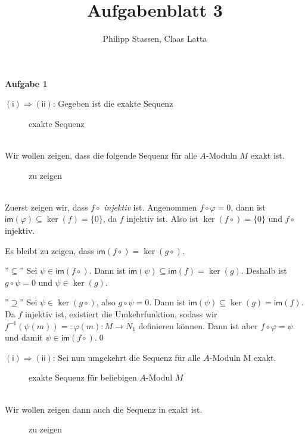 \documentclass{article}
\title{Aufgabenblatt 3}
\author{Philipp Stassen, Claas Latta}
\theoremstyle{definition}
\theoremstyle{plain}
\theoremstyle{remark}
\newcommand{\im}{\mathsf{im}}
\newcommand{\aufgabe}[1]{
	{
		\vspace*{0.5cm}
		\textsf{\textbf{Aufgabe #1}}
		\vspace*{0.2cm}

	}
}
\begin{document}
\maketitle
\aufgabe1
$\mathsf{(i)\Rightarrow (ii)}$: 
Gegeben ist die exakte Sequenz
\begin{figure}[h]
\centering
{}
\caption{exakte Sequenz}
\end{figure}\\
Wir wollen zeigen, dass die folgende Sequenz für alle $A$-Moduln $M$ exakt ist.
\begin{figure}[h]
\centering
{}
\caption{zu zeigen}
\end{figure} \\
Zuerst zeigen wir, dass $f\circ$ \emph{injektiv} ist. Angenommen $f\circ\varphi=0$, dann ist $\im(\varphi)\subseteq\ker(f)=\{0\}$, da $f$ injektiv ist. Also ist $\ker(f\circ)=\{0\}$ und $f\circ$ injektiv.\smallskip

Es bleibt zu zeigen, dass $\im(f\circ)=\ker(g\circ)$. 

\noindent ''$\subseteq$'' Sei $\psi\in\im(f\circ)$. Dann ist $\im(\psi)\subseteq\im(f)=\ker(g)$. Deshalb ist $g\circ \psi =0$ und $\psi\in\ker(g)$.

\noindent ''$\supseteq$'' Sei $\psi\in\ker(g\circ)$, also $g\circ\psi=0$. Dann ist $\im(\psi)\subseteq\ker(g)=\im(f)$. Da $f$ injektiv ist, existiert die Umkehrfunktion, sodass wir $f^{-1}(\psi(m))=:\varphi(m):M\to N_1$ definieren können. Dann ist aber $f\circ\varphi=\psi$ und damit $\psi\in\im(f\circ)$.\qed \medskip

$\mathsf{(i)}\Rightarrow\mathsf{(ii)}$: Sei nun umgekehrt die Sequenz für alle $A$-Moduln M exakt.
\begin{figure}[h]
\centering
{}
\caption{exakte Sequenz für beliebigen $A$-Modul $M$}
\end{figure} \\
Wir wollen zeigen dann auch die Sequenz in  exakt ist.\clearpage
\begin{figure}[ht]
\centering
{}
\caption{zu zeigen} \label{diagramm:1nichthom}
\end{figure}
\end{document}
